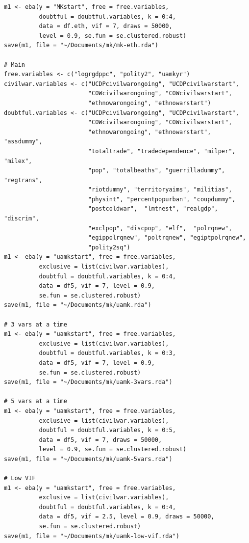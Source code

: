 \begin{verbatim}
m1 <- eba(y = "MKstart", free = free.variables,
          doubtful = doubtful.variables, k = 0:4,
          data = df.eth, vif = 7, draws = 50000,
          level = 0.9, se.fun = se.clustered.robust)
save(m1, file = "~/Documents/mk/mk-eth.rda")

# Main
free.variables <- c("logrgdppc", "polity2", "uamkyr")
civilwar.variables <- c("UCDPcivilwarongoing", "UCDPcivilwarstart",
                        "COWcivilwarongoing", "COWcivilwarstart",
                        "ethnowarongoing", "ethnowarstart")
doubtful.variables <- c("UCDPcivilwarongoing", "UCDPcivilwarstart",
                        "COWcivilwarongoing", "COWcivilwarstart",
                        "ethnowarongoing", "ethnowarstart", "assdummy",
                        "totaltrade", "tradedependence", "milper", "milex",
                        "pop", "totalbeaths", "guerrilladummy", "regtrans",
                        "riotdummy", "territoryaims", "militias",
                        "physint", "percentpopurban", "coupdummy",
                        "postcoldwar",  "lmtnest", "realgdp", "discrim",
                        "exclpop", "discpop", "elf",  "polrqnew",
                        "egippolrqnew", "poltrqnew", "egiptpolrqnew",
                        "polity2sq")
m1 <- eba(y = "uamkstart", free = free.variables,
          exclusive = list(civilwar.variables),
          doubtful = doubtful.variables, k = 0:4,
          data = df5, vif = 7, level = 0.9, 
          se.fun = se.clustered.robust)
save(m1, file = "~/Documents/mk/uamk.rda")

# 3 vars at a time
m1 <- eba(y = "uamkstart", free = free.variables,
          exclusive = list(civilwar.variables),
          doubtful = doubtful.variables, k = 0:3,
          data = df5, vif = 7, level = 0.9,
          se.fun = se.clustered.robust)
save(m1, file = "~/Documents/mk/uamk-3vars.rda")

# 5 vars at a time
m1 <- eba(y = "uamkstart", free = free.variables,
          exclusive = list(civilwar.variables),
          doubtful = doubtful.variables, k = 0:5,
          data = df5, vif = 7, draws = 50000,
          level = 0.9, se.fun = se.clustered.robust)
save(m1, file = "~/Documents/mk/uamk-5vars.rda")

# Low VIF
m1 <- eba(y = "uamkstart", free = free.variables,
          exclusive = list(civilwar.variables),
          doubtful = doubtful.variables, k = 0:4,
          data = df5, vif = 2.5, level = 0.9, draws = 50000,
          se.fun = se.clustered.robust)
save(m1, file = "~/Documents/mk/uamk-low-vif.rda")


\end{verbatim}
